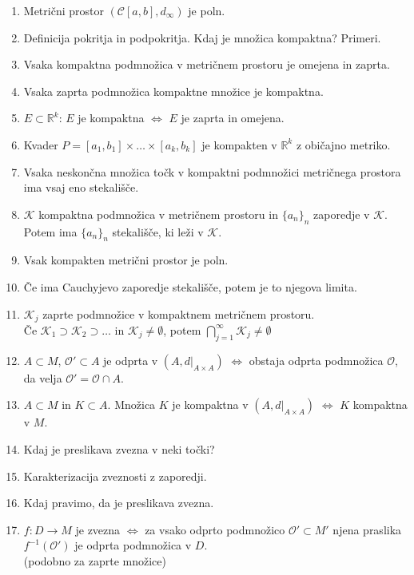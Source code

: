 \documentclass[a4paper,12pt]{report}
\begin{document}
\begin{enumerate}
    \item Metrični prostor $(\mathcal{C}[a, b], d_{\infty})$ je poln.
    \item Definicija pokritja in podpokritja. Kdaj je množica kompaktna? Primeri.
    \item Vsaka kompaktna podmnožica v metričnem prostoru je omejena in zaprta.
    \item Vsaka zaprta podmnožica kompaktne množice je kompaktna.
    \item $E \subset \mathbb{R}^k$: $E$ je kompaktna $\iff$ $E$ je zaprta in omejena.
    \item Kvader $P = [a_1, b_1] \times \dots \times [a_k, b_k]$ je kompakten v $\mathbb{R}^k$ z običajno metriko.
    \item Vsaka neskončna množica točk v kompaktni podmnožici metričnega prostora ima vsaj eno stekališče.
    \item $\mathcal{K}$ kompaktna podmnožica v metričnem prostoru in $\{a_n\}_n$ zaporedje v $\mathcal{K}$. Potem ima $\{a_n\}_n$ stekališče, ki leži v $\mathcal{K}$.
    \item Vsak kompakten metrični prostor je poln.
    \item Če ima Cauchyjevo zaporedje stekališče, potem je to njegova limita.
    \item $\mathcal{K}_j$ zaprte podmnožice v kompaktnem metričnem prostoru. \\ Če $\mathcal{K}_1 \supset \mathcal{K}_2 \supset \dots$ in $\mathcal{K}_j \neq \emptyset$, potem $\bigcap\limits_{j=1}^{\infty} \mathcal{K}_j \neq \emptyset$
    \item $A \subset M$, $\mathcal{O}' \subset A$ je odprta v $(A, d|_{A \times A})$ $\iff$ obstaja odprta podmnožica $\mathcal{O}$, da velja $\mathcal{O}' = \mathcal{O} \cap A$.
    \item $A \subset M$ in $K \subset A$. Množica $K$ je kompaktna v $(A, d|_{A \times A})$ $\iff$ $K$ kompaktna v $M$.
    \item Kdaj je preslikava zvezna v neki točki?
    \item Karakterizacija zveznosti z zaporedji.
    \item Kdaj pravimo, da je preslikava zvezna.
    \item $f: D \to M$ je zvezna $\iff$ za vsako odprto podmnožico $\mathcal{O}' \subset M'$ njena praslika $f^{-1}(\mathcal{O}')$ je odprta podmnožica v $D$. \\ (podobno za zaprte množice)
\end{enumerate}
\end{document}
